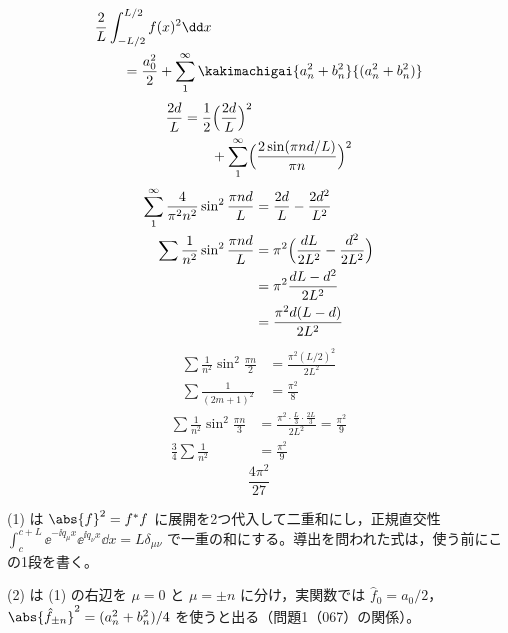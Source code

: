 \mikai
{}
\mikai
{}
\begin{align*}
  &\frac{2}{L}\int_{-L/2}^{L/2}f(x)^{2}\dd x\\
  &\qquad=\frac{a_0^{2}}{2}+\sum_{1}^{\infty}\kakimachigai{a_n^{2}+b_n^{2}}{(a_n^{2}+b_n^{2})}
\end{align*}
\begin{align*}
  \frac{2d}{L}&=\frac{1}{2}\Bigl(\frac{2d}{L}\Bigr)^{2}\\
  &\qquad+\sum_{1}^{\infty}\Bigl(\frac{2\sin(\pi nd/L)}{\pi n}\Bigr)^{2}
\end{align*}
\begin{align*}
  \sum_{1}^{\infty}\frac{4}{\pi^{2}n^{2}}\sin^{2}\frac{\pi nd}{L}&=\frac{2d}{L}-\frac{2d^{2}}{L^{2}}\\
  \sum\frac{1}{n^{2}}\sin^{2}\frac{\pi nd}{L}&=\pi^{2}\Bigl(\frac{dL}{2L^{2}}-\frac{d^{2}}{2L^{2}}\Bigr)\\
  &=\pi^{2}\frac{dL-d^{2}}{2L^{2}}\\
  &=\frac{\pi^{2}d(L-d)}{2L^{2}}
\end{align*}
\begin{align*}
  \sum\frac{1}{n^{2}}\sin^{2}\frac{\pi n}{2}&=\frac{\pi^{2}(L/2)^{2}}{2L^{2}}\\
  \sum\frac{1}{(2m+1)^{2}}&=\frac{\pi^{2}}{8}
\end{align*}
\begin{align*}
  \sum\frac{1}{n^{2}}\sin^{2}\frac{\pi n}{3}&=\frac{\pi^{2}\cdot\frac{L}{3}\cdot\frac{2L}{3}}{2L^{2}}=\frac{\pi^{2}}{9}\\
  \frac{3}{4}\sum\frac{1}{n^{2}}&=\frac{\pi^{2}}{9}
\end{align*}
\[ \frac{4\pi^{2}}{27} \]
\item (1) は $\abs{f}^{2}=f^{*}f$ に展開を2つ代入して二重和にし，正規直交性 $\int_c^{c+L}\ee^{-\ii q_{\mu}x}\ee^{\ii q_{\nu}x}\dd x=L\delta_{\mu\nu}$ で一重の和にする。導出を問われた式は，使う前にこの1段を書く。
\item (2) は (1) の右辺を $\mu=0$ と $\mu=\pm n$ に分け，実関数では $\hat{f}_0=a_0/2$，$\abs{\hat{f}_{\pm n}}^{2}=(a_n^{2}+b_n^{2})/4$ を使うと出る（問題1（067）の関係）。
